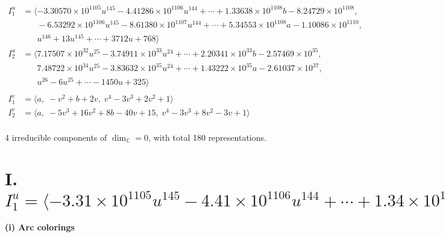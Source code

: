 \documentclass[1p]{elsarticle_modified}
\theoremstyle{definition}
\begin{document}
\begin{align*}
I^u_{1}&=\langle 
-3.30570\times10^{1105} u^{145}-4.41286\times10^{1106} u^{144}+\cdots+1.33638\times10^{1108} b-8.24729\times10^{1108},\\
\phantom{I^u_{1}}&\phantom{= \langle  }-6.53292\times10^{1106} u^{145}-8.61380\times10^{1107} u^{144}+\cdots+5.34553\times10^{1108} a-1.10086\times10^{1110},\\
\phantom{I^u_{1}}&\phantom{= \langle  }u^{146}+13 u^{145}+\cdots+3712 u+768\rangle \\
I^u_{2}&=\langle 
7.17507\times10^{32} u^{25}-3.74911\times10^{33} u^{24}+\cdots+2.20341\times10^{33} b-2.57469\times10^{35},\\
\phantom{I^u_{2}}&\phantom{= \langle  }7.48722\times10^{34} u^{25}-3.83632\times10^{35} u^{24}+\cdots+1.43222\times10^{35} a-2.61037\times10^{37},\\
\phantom{I^u_{2}}&\phantom{= \langle  }u^{26}-6 u^{25}+\cdots-1450 u+325\rangle \\
\\
I^v_{1}&=\langle 
a,\;- v^2+b+2 v,\;v^4-3 v^3+2 v^2+1\rangle \\
I^v_{2}&=\langle 
a,\;-5 v^3+16 v^2+8 b-40 v+15,\;v^4-3 v^3+8 v^2-3 v+1\rangle \\
\end{align*}
\raggedright * 4 irreducible components of $\dim_{\mathbb{C}}=0$, with total 180 representations.\\
\newpage
\renewcommand{\arraystretch}{1}
\centering \section*{I. $I^u_{1}= \langle -3.31\times10^{1105} u^{145}-4.41\times10^{1106} u^{144}+\cdots+1.34\times10^{1108} b-8.25\times10^{1108},\;-6.53\times10^{1106} u^{145}-8.61\times10^{1107} u^{144}+\cdots+5.35\times10^{1108} a-1.10\times10^{1110},\;u^{146}+13 u^{145}+\cdots+3712 u+768 \rangle$}
\flushleft \textbf{(i) Arc colorings}\\
\end{document}
